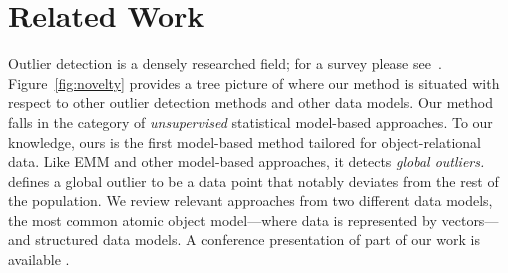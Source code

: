{				\section{Related Work}
				Outlier detection is a densely researched field; for a survey please see~\citep{aggarwal2013,Akoglu2015}.
				Figure~\ref{fig:novelty} provides a tree picture of where our method is situated with respect to other outlier detection methods and other data models. 
				Our method falls in the category of {\em unsupervised} statistical model-based approaches. To our knowledge, ours is the first model-based method tailored for object-relational data. Like EMM and other model-based approaches, it detects {\em global outliers.} \citet{aggarwal2013} defines a global outlier to be a data point that notably deviates from the rest of the population. We review relevant approaches from two different data models, the most common atomic object model---where data is represented by vectors---and structured data models. A conference presentation of part of our work is available \citep{Riahi2015}. \\
				
}
